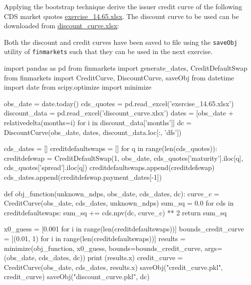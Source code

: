 \cprotEnv\begin{question}
Applying the bootstrap technique derive the issuer credit curve of the following CDS market quotes
\href{https://github.com/matteosan1/finance_course/raw/master/input_files/exercise_14.65.xlsx}{exercise\_14.65.xlsx}.
The discount curve to be used can be downloaded from  \href{https://github.com/matteosan1/finance_course/raw/master/input_files/discount_curve.xlsx}{discount\_curve.xlsx}:
\end{question}

\cprotEnv\begin{solution}

Both the discount and credit curves have been saved to file using the \texttt{saveObj} utility of \texttt{finmarkets} such that they can be used in the next exercise.

\begin{ipython}
import pandas as pd
from finmarkets import generate_dates, CreditDefaultSwap
from finmarkets import CreditCurve, DiscountCurve, saveObj
from datetime import date
from scipy.optimize import minimize

obs_date = date.today()
cds_quotes = pd.read_excel('exercise_14.65.xlsx')
discount_data = pd.read_excel('discount_curve.xlsx')
dates = [obs_date + relativedelta(months=i) for i in discount_data['months']]
dc = DiscountCurve(obs_date, dates, discount_data.loc[:, 'dfs'])

cds_dates = []
creditdefaultswaps = []
for q in range(len(cds_quotes)):
    creditdefswap = CreditDefaultSwap(1, obs_date, 
                                      cds_quotes['maturity'].iloc[q], 
                                      cds_quotes['spread'].iloc[q])
    creditdefaultswaps.append(creditdefswap)
    cds_dates.append(creditdefswap.payment_dates[-1])
    
def obj_function(unknown_ndps, obs_date, cds_dates, dc):
    curve_c = CreditCurve(obs_date, cds_dates, unknown_ndps)
    sum_sq = 0.0
    for cds in creditdefaultswaps:
        sum_sq += cds.npv(dc, curve_c) ** 2
    return sum_sq

x0_guess = [0.001 for i in range(len(creditdefaultswaps))]
bounds_credit_curve = [(0.01, 1) for i in range(len(creditdefaultswaps))]
results = minimize(obj_function, x0_guess, bounds=bounds_credit_curve,
                   args=(obs_date, cds_dates, dc))
print (results.x)
credit_curve = CreditCurve(obs_date, cds_dates, results.x)
saveObj("credit_curve.pkl", credit_curve)
saveObj("discount_curve.pkl", dc)
\end{ipython}
\begin{ioutput}
[0.90641296 0.80370758 0.70836204 0.49555918 0.29156774 0.06680166]
\end{ioutput}
\end{solution}

